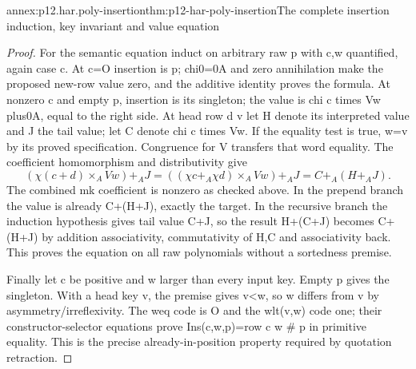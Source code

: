 \begin{annexitem}{annex:p12.har.poly-insertion}{thm:p12-har-poly-insertion}{The complete insertion induction, key invariant and value equation}
\begin{proof}
For the semantic equation induct on arbitrary raw p with c,w quantified,
again case c. At c=O insertion is p; chi0=0A and zero annihilation
make the proposed new-row value zero, and the additive identity proves
the formula. At nonzero c and empty p, insertion is its singleton;
the value is chi c times Vw plus0A, equal to the right side.
At head row d v let H denote its interpreted value and J the tail
value; let C denote chi c times Vw. If the equality test is true,
w=v by its proved specification. Congruence for V transfers that
word equality. The coefficient homomorphism and distributivity give
\[
 (\chi(c+d)\times_A Vw)+_A J
   =((\chi c+_A\chi d)\times_A Vw)+_A J
   =C+_A(H+_A J).
\]
The combined mk coefficient is nonzero as checked above. In the
prepend branch the value is already C+(H+J), exactly the target.
In the recursive branch the induction hypothesis gives tail value
C+J, so the result H+(C+J) becomes C+(H+J) by addition associativity,
commutativity of H,C and associativity back. This proves the equation
on all raw polynomials without a sortedness premise.

Finally let c be positive and w larger than every input key. Empty
p gives the singleton. With a head key v, the premise gives v<w,
so w differs from v by asymmetry/irreflexivity. The weq code is O
and the wlt(v,w) code one; their constructor-selector equations prove
Ins(c,w,p)=row c w \# p in primitive equality. This is the precise
already-in-position property required by quotation retraction.
\end{proof}
\end{annexitem}

